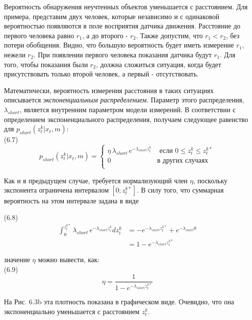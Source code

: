 \documentclass[10pt,a4paper]{article}
\begin{document}
Вероятность обнаружения неучтенных объектов уменьшается с расстоянием. Для примера, представим двух человек, которые независимо и с одинаковой вероятностью появляются в поле восприятия датчика движения. Расстояние до первого человека равно $r_1$, а до второго - $r_2$. Также допустим, что $r_1 < r_2$, без потери обобщения. Видно, что большую вероятность будет иметь измерение $r_1$, нежели $r_2$. При появлении первого человека показания датчика будут $r_1$. Для того, чтобы показания были $r_2$, должна сложиться ситуация, когда будет присутствовать только второй человек, а первый - отсутствовать.

Математически, вероятность измерения расстояния в таких ситуациях описывается \textit{экспоненциальным распределением}. Параметр этого распределения, $\lambda_{short}$, является внутренним параметром модели измерений. В соответствии с определением экспоненциального распределения, получаем следующее равенство для $p_{short}(z_t^k | x_t, m)$: \\

(6.7)
\begin{equation*}
p_{short}(z_t^k | x_t, m)=\left\{
\begin{array}{ll}
\eta\, \lambda_{short}\,e^{-\lambda_{short}z_t^k} & \mbox{ если }0\leq z_t^k\leq z_t^{k*}\\
0 & \mbox{в других случаях}\\
\end{array}
\right.
\end{equation*}

Как и в предыдущем случае, требуется нормализующий член $\eta$, поскольку экспонента ограничена интервалом $[0;z_t^{k*}]$. В силу того, что суммарная вероятность на этом интервале задана в виде 

(6.8)
\begin{equation*}
\begin{split}
\int_0^{z_t^{k*}}\lambda_{short}\,e^{-\lambda_{short}z_t^k}dz_t^k&=-e^{-\lambda_{short}z_t^{k*}}+e^{-\lambda_{short}0}\\
&=1-e^{-\lambda_{short}z_t^{k*}}
\end{split}
\end{equation*}

значение $\eta$ можно вывести, как:\\

(6.9)
$$\eta=\frac{1}{1-e^{-\lambda_{short}z_t^{k*}}}$$

На Рис. 6.3b эта плотность показана в графическом виде. Очевидно, что она экспоненциально уменьшается с расстоянием $z_t^k$.\\
\end{document}
